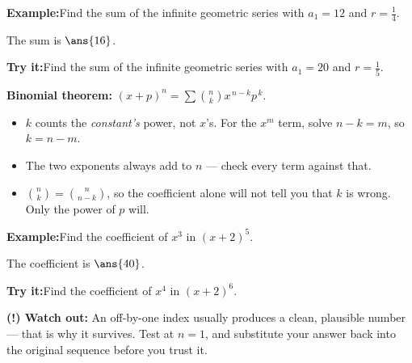 \documentclass[12pt]{article}
\begin{document}
\begin{examplebox}
\textbf{Example:}\quad Find the sum of the infinite geometric series with
$a_1 = 12$ and $r = \frac{1}{4}$.

The sum is $\ans{16}$.
\end{examplebox}

\begin{tryitbox}
\textbf{Try it:}\quad Find the sum of the infinite geometric series with
$a_1 = 20$ and $r = \frac{1}{5}$.\\[2pt]
\end{tryitbox}


\begin{formulabox}
\textbf{Binomial theorem:} $(x+p)^n = \sum \binom{n}{k}x^{\,n-k}p^{\,k}$.
\begin{itemize}[leftmargin=0.8cm, itemsep=1pt, topsep=2pt]
  \item $k$ counts the \emph{constant's} power, not $x$'s. For the $x^m$ term,
        solve $n - k = m$, so $k = n - m$.
  \item The two exponents always add to $n$ --- check every term against that.
  \item $\binom{n}{k} = \binom{n}{n-k}$, so the coefficient alone will not tell
        you that $k$ is wrong. Only the power of $p$ will.
\end{itemize}
\end{formulabox}

\begin{examplebox}
\textbf{Example:}\quad Find the coefficient of $x^3$ in $(x+2)^5$.

The coefficient is $\ans{40}$.
\end{examplebox}

\begin{tryitbox}
\textbf{Try it:}\quad Find the coefficient of $x^4$ in $(x+2)^6$.\\[2pt]
\end{tryitbox}

\begin{watchoutbox}
\textbf{(!) Watch out:} An off-by-one index usually produces a clean, plausible
number --- that is why it survives. Test at $n=1$, and substitute your answer
back into the original sequence before you trust it.
\end{watchoutbox}
\end{document}
